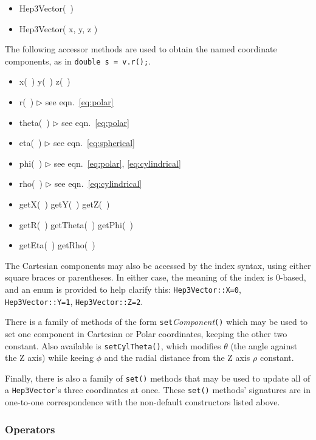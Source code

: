 \documentclass[twoside,12pt]{article}
\def \SV {{\tt Hep3Vector}}
\newcommand {\see}[1] {\hfill$\triangleright$ see eqn.~#1}
\newenvironment{shortlist}{%
\begin{itemize}
\setlength{\itemsep}{0pt}
\setlength{\parskip}{0pt}
}{%
\end{itemize}
}
\begin{document}
\begin{shortlist}
  \item Hep3Vector(~)
  \item Hep3Vector( x, y, z ) 
\end{shortlist}

\noindent
The following accessor methods are used
to obtain the named coordinate components,
as in \verb|double s = v.r();|.

\begin{shortlist}
  \item x(~) \/\/\/ y(~) \/\/\/ z(~) 
  \item r(~) \see{\ref{eq:polar}}
  \item theta(~) \see{\ref{eq:polar}}
  \item eta(~) \see{\ref{eq:spherical}}
  \item phi(~) \see{\ref{eq:polar}, \ref{eq:cylindrical}}
  \item rho(~) \see{\ref{eq:cylindrical}}
  \item getX(~) \/\/\/ getY(~) \/\/\/ getZ(~) 
  \item getR(~) \/\/\/ getTheta(~) \/\/\/ getPhi(~)
  \item getEta(~) \/\/\/ getRho(~)
\end{shortlist}

\noindent
The Cartesian components may also be accessed by the index syntax, 
using either square braces or parentheses.  
In either case, the meaning of the index is 0-based, 
and an enum is provided to help clarify this: {\tt Hep3Vector::X=0},
{\tt Hep3Vector::Y=1}, {\tt Hep3Vector::Z=2}.

\noindent
There is a family of methods of the form
{\tt set}{\it Component}{\tt ()} which may be used to set 
one component in Cartesian or Polar coordinates, keeping the other
two constant.  
Also available is {\tt setCylTheta()}, which modifies $\theta$ (the angle
against the Z axis) while keeing $\phi$ and the radial distance from the 
Z axis $\rho$ constant.

\noindent
Finally, there is also a family of {\tt set()} methods
that may be used to update all of a \SV 's three coordinates at once.
These {\tt set()} methods' signatures are in one-to-one correspondence
with the non-default constructors listed above.

\subsubsection{Operators}
\end{document}
